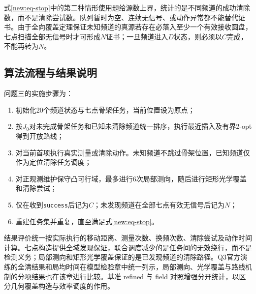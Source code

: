 式\eqref{new:eq-stop}中的第二种情形使用题给源数上界，统计的是不同频道的成功清除数，而不是清除尝试数。队列暂时为空、连续无信号、或动作异常都不能替代证书。由于全向覆盖定理保证未知频道的真源若存在必落入至少一个有效接收圆盘，七点扫描全部无信号时才可形成$N$证书；一旦频道进入$D$状态，则必须以$C$完成，不能再转为$N$。

\subsection{算法流程与结果说明}
问题三的实施步骤为：
\begin{enumerate}
 \item 初始化20个频道状态与七点骨架任务，当前位置设为原点；
 \item 按$J_0$对未完成骨架任务和已知未清除频道统一排序，执行最近插入及有界2-opt得到开放路线；
 \item 对当前首项执行真实测量或清除动作。未知频道不跳过骨架位置，已知频道仅作为定位清除任务调度；
 \item 对正观测维护保守凸可行域，最多进行6次局部测向，随后进行矩形光学覆盖和清除尝试；
 \item 仅在收到\texttt{success}后记为$C$；未发现频道在全部七点有效无信号后记为$N$；
 \item 重建任务集并重复，直至满足式\eqref{new:eq-stop}。
\end{enumerate}

结果评价统一按实际执行的移动距离、测量次数、换频次数、清除尝试及动作时间计算。七点构造提供全域发现保证，联合调度减少的是任务间的无效绕行，而不是检测义务；局部测向和矩形光学覆盖保证的是已发现频道的清除路径。Q3官方演练的全清结果和局均时间在模型检验章中统一列示，局部测向、光学覆盖与路线机制的分项结果也在该章进行比较。基准 refined 与 field 对照增强分开统计，以区分几何覆盖构造与效率调度的作用。
